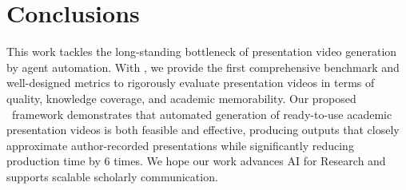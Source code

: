 \vspace{-0.4\baselineskip} 
\section{Conclusions}
\vspace{-0.4\baselineskip} 
This work tackles the long-standing bottleneck of presentation video generation by agent automation. 
With \bench, we provide the first comprehensive benchmark and well-designed metrics to rigorously evaluate presentation videos in terms of quality, knowledge coverage, and academic memorability. 
Our proposed \agent~framework demonstrates that automated generation of ready-to-use academic presentation videos is both feasible and effective, producing outputs that closely approximate author-recorded presentations while significantly reducing production time by 6 times. 
We hope our work advances AI for Research and supports scalable scholarly communication.

